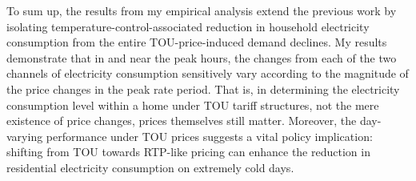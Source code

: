 To sum up, the results from my empirical analysis extend the previous work by isolating temperature-control-associated reduction in household electricity consumption from the entire TOU-price-induced demand declines. My results demonstrate that in and near the peak hours, the changes from each of the two channels of electricity consumption sensitively vary according to the magnitude of the price changes in the peak rate period. That is, in determining the electricity consumption level within a home under TOU tariff structures, not the mere existence of price changes, prices themselves still matter. Moreover, the day-varying performance under TOU prices suggests a vital policy implication: shifting from TOU towards RTP-like pricing can enhance the reduction in residential electricity consumption on extremely cold days.
